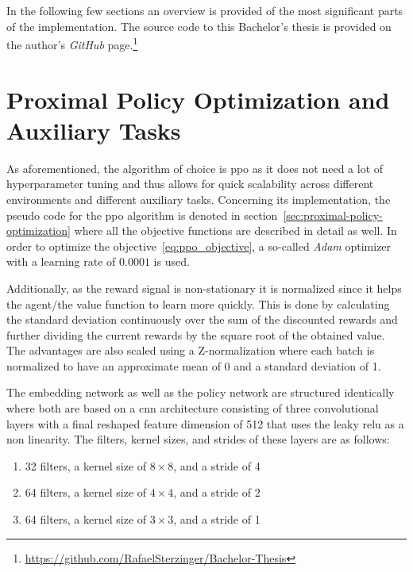 \documentclass[draft,final]{vutinfth} %
\begin{document}
    In the following few sections an overview is provided of the most significant parts of the implementation.
    The source code to this Bachelor's thesis is provided on the author's \textit{GitHub} page.\footnote{\url{https://github.com/RafaelSterzinger/Bachelor-Thesis}}


    \section{Proximal Policy Optimization and Auxiliary Tasks}\label{sec:proximal-policy-optimization-and-auxiliary-tasks}

    As aforementioned, the algorithm of choice is \gls{ppo} as it does not need a lot of hyperparameter tuning and thus allows for quick scalability across different environments and different auxiliary tasks.
    Concerning its implementation, the pseudo code for the \gls{ppo} algorithm is denoted in section~\ref{sec:proximal-policy-optimization} where all the objective functions are described in detail as well.
    In order to optimize the objective~\ref{eq:ppo_objective}, a so-called \textit{Adam} optimizer with a learning rate of $0.0001$ is used.

    Additionally, as the reward signal is non-stationary it is normalized since it helps the agent/the value function to learn more quickly.
    This is done by calculating the standard deviation continuously over the sum of the discounted rewards and further dividing the current rewards by the square root of the obtained value.
    The advantages are also scaled using a Z-normalization where each batch is normalized to have an approximate mean of 0 and a standard deviation of 1.

    The embedding network as well as the policy network are structured identically where both are based on a \gls{cnn} architecture consisting of three convolutional layers with a final reshaped feature dimension of 512 that uses the leaky \gls{relu} as a non linearity.
    The filters, kernel sizes, and strides of these layers are as follows:

    \begin{enumerate}
        \item 32 filters, a kernel size of $8 \times 8$, and a stride of 4
        \item 64 filters, a kernel size of $4 \times 4$, and a stride of 2
        \item 64 filters, a kernel size of $3 \times 3$, and a stride of 1
    \end{enumerate}
\end{document}
